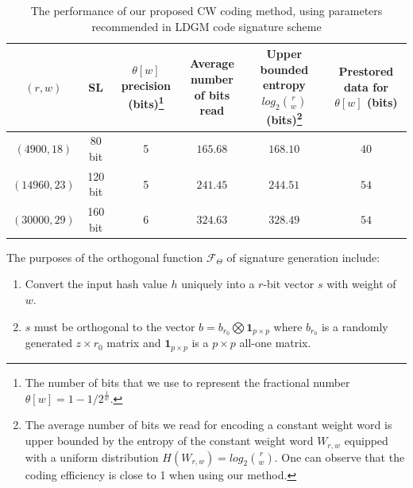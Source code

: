 \documentclass[10pt,journal,compsoc]{IEEEtran}
\begin{document}
\begin{table}[!t]\centering
\caption{The performance of our proposed CW coding method, using parameters recommended in LDGM code signature scheme}
\label{table:CWcoding}
\begin{minipage}{\textwidth}\centering
\begin{tabular}{cccccc}
\hline
$(r, w)$ &  SL & \tabincell{c}{$\theta[w]$ precision\\(bits)}\footnote[$\ast$]{The number of bits that we use to represent the fractional number $\theta[w]=1-1/2^{\frac{1}{w}}$. } & \tabincell{c}{Average number\\ of bits read}  & \tabincell{c}{Upper bounded entropy\\ $log_2\binom{r}{w}$ (bits)}\footnote[$\dag$]{The average number
of bits we read for encoding a constant weight word is upper bounded
by the entropy of the constant weight word $W_{r,w}$ equipped with a uniform distribution
$H(W_{r,w}) = log_2\binom{r}{w}$. One can observe that the coding efficiency is close to 1 when using our method.}& \tabincell{c}{Prestored data for $\theta[w]$ \\(bits)} \\
\hline
$(4900,18)$ & 80 bit  &  5  &   $165.68$    & $168.10$  & $40$\\
$(14960,23)$ & 120 bit   & 5   &  $241.45$    & $244.51$ & $54$ \\
$(30000,29)$ & 160 bit   &  6  & $324.63$        & $328.49$ & $54$ \\
\hline
\end{tabular}
\end{minipage}
\end{table}

The purposes of the orthogonal function $\mathcal{F}_\Theta$ of signature generation include:
\begin{enumerate}
\item Convert the input hash value $h$ uniquely into a $r$-bit vector $s$ with weight of $w$.
\item $s$ must be orthogonal to the vector $b = b_{r_0}\bigotimes \textbf{1}_{p\times p}$ where $b_{r_0}$ is a randomly generated $z\times r_0$ matrix and   $\textbf{1}_{p\times p}$  is a $p\times p$ all-one matrix.
\end{enumerate}
\end{document}
